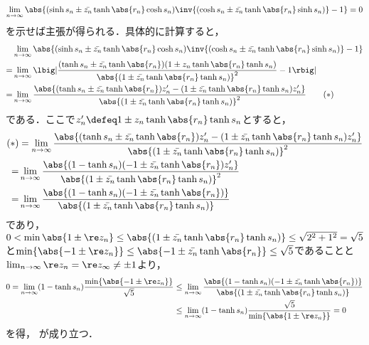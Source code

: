 \begin{ncalcof}
    
  \begin{align*}
    \lim_{n\to \infty}\abs{(\sinh s_n \pm \bar{z_n} \tanh \abs{r_n} \cosh s_n)\inv{(\cosh s_n \pm \bar{z_n} \tanh \abs{r_n} \sinh s_n) } - 1} = 0
  \end{align*}
  を示せば主張が得られる．具体的に計算すると，
  \begin{align}
    &\lim_{n\to \infty}\abs{(\sinh s_n \pm \bar{z_n} \tanh \abs{r_n} \cosh s_n)\inv{(\cosh s_n \pm \bar{z_n} \tanh \abs{r_n} \sinh s_n) } - 1}\notag \\
    = & \lim_{n\to \infty}\lbig|\frac{(\tanh s_n\pm \bar{z_n}\tanh \abs{r_n})(1 \pm z_n \tanh\abs{r_n}\tanh s_n )}{\abs{(1 \pm \bar{z_n} \tanh\abs{r_n}\tanh s_n )}^2} - 1 \rbig|\notag \\    
    = & \lim_{n\to \infty}\frac{\abs{(\tanh s_n\pm \bar{z_n}\tanh \abs{r_n})z_n' - (1 \pm \bar{z_n} \tanh\abs{r_n}\tanh s_n )z_n' }}{\abs{(1 \pm \bar{z_n} \tanh\abs{r_n}\tanh s_n )}^2}\label{eq:ast} \tag{$\ast$}
  \end{align}
  である．ここで$ z_n'\defeq 1 \pm z_n\tanh\abs{r_n}\tanh s_n$とすると，
  \begin{align*}
    (\ast) &= \lim_{n\to \infty}\frac{\abs{(\tanh s_n\pm \bar{z_n}\tanh \abs{r_n})z_n' - (1 \pm \bar{z_n} \tanh\abs{r_n}\tanh s_n )z_n' }}{\abs{(1 \pm \bar{z_n} \tanh\abs{r_n}\tanh s_n )}^2}\\
    = & \lim_{n\to \infty}\frac{\abs{(1-\tanh s_n)(-1\pm \bar{z_n}\tanh \abs{r_n} )z_n'}}{\abs{(1 \pm \bar{z_n} \tanh\abs{r_n}\tanh s_n )}^2} \\
    = & \lim_{n\to \infty}\frac{\abs{(1-\tanh s_n)(-1\pm \bar{z_n}\tanh \abs{r_n} )}}{\abs{(1 \pm \bar{z_n} \tanh\abs{r_n}\tanh s_n )}} 
  \end{align*}
  であり，
  $0 < \min{\abs{1\pm \re z_n}}\leq  \abs{(1 \pm \bar{z_n} \tanh\abs{r_n}\tanh s_n )}\leq \sqrt{2^2 + 1^2} = \sqrt{5} $と$\min\{\abs{-1\pm \re z_n } \}  \leq \abs{-1\pm\bar{z_n}\tanh \abs{r_n} } \leq \sqrt{5} $であることと$\lim_{n\to \infty} \re z_n = \re z_{\infty} \neq \pm 1$より，
    \begin{align*}
      0 = \lim_{n\to \infty}(1-\tanh s_n)\frac{\min\{\abs{-1\pm \re z_n} \}}{\sqrt{5}}  &\leq \lim_{n\to \infty}\frac{\abs{(1-\tanh s_n)(-1\pm \bar{z_n}\tanh \abs{r_n} )}}{\abs{(1 \pm \bar{z_n} \tanh\abs{r_n}\tanh s_n )}}\\
      &\leq \lim_{n\to \infty}(1-\tanh s_n)\frac{\sqrt{5}}{\min\{\abs{1\pm \re z_n} \}} = 0
    \end{align*}
    を得， が成り立つ．
\end{ncalcof}


